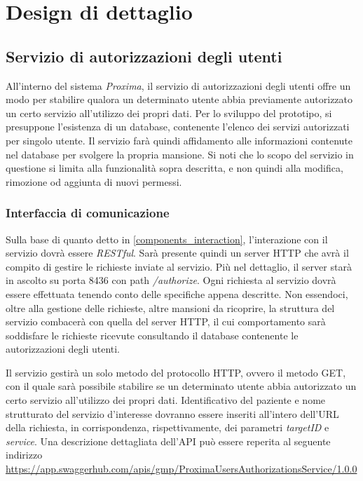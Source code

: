 \documentclass[a4paper,12pt]{report}
\begin{document}
\chapter{Design di dettaglio}

\section{Servizio di autorizzazioni degli utenti} \label{users_authorizations_design}

All'interno del sistema \emph{Proxima}, il servizio di autorizzazioni degli utenti offre un modo per stabilire qualora un determinato utente abbia previamente autorizzato un certo servizio all'utilizzo dei propri dati. Per lo sviluppo del prototipo, si presuppone l'esistenza di un database, contenente l'elenco dei servizi autorizzati per singolo utente. Il servizio farà quindi affidamento alle informazioni contenute nel database per svolgere la propria mansione. Si noti che lo scopo del servizio in questione si limita alla funzionalità sopra descritta, e non quindi alla modifica, rimozione od aggiunta di nuovi permessi. 

\subsection{Interfaccia di comunicazione}

Sulla base di quanto detto in \autoref{components_interaction}, l'interazione con il servizio dovrà essere \emph{RESTful}. Sarà presente quindi un server HTTP che avrà il compito di gestire le richieste inviate al servizio. Più nel dettaglio, il server starà in ascolto su porta 8436 con path \emph{/authorize}. Ogni richiesta al servizio dovrà essere effettuata tenendo conto delle specifiche appena descritte. Non essendoci, oltre alla gestione delle richieste, altre mansioni da ricoprire, la struttura del servizio combacerà con quella del server HTTP, il cui comportamento sarà soddisfare le richieste ricevute consultando il database contenente le autorizzazioni degli utenti.

Il servizio gestirà un solo metodo del protocollo HTTP, ovvero il metodo GET, con il quale sarà possibile stabilire se un determinato utente abbia autorizzato un certo servizio all'utilizzo dei propri dati. Identificativo del paziente e nome strutturato del servizio d'interesse dovranno essere inseriti all'intero dell'URL della richiesta, in corrispondenza, rispettivamente, dei parametri \emph{targetID} e \emph{service}. Una descrizione dettagliata dell'API può essere reperita al seguente indirizzo \url{https://app.swaggerhub.com/apis/gmp/ProximaUsersAuthorizationsService/1.0.0}
\end{document}
